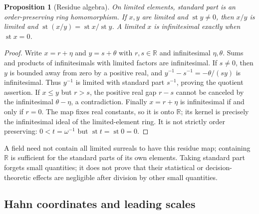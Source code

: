 \documentclass[11pt,a4paper]{article}
\numberwithin{equation}{section}
\newtheorem{proposition}[theorem]{Proposition}
\theoremstyle{definition}
\theoremstyle{remark}
\newcommand{\R}{\mathbb R}
\newcommand{\st}{\operatorname{st}}
\begin{document}
\begin{proposition}[Residue algebra]\label{fsp:prop:st}
On limited elements, standard part is an order-preserving ring homomorphism.
If $x,y$ are limited and $\st y\ne0$, then $x/y$ is limited and
$\st(x/y)=\st x/\st y$. A limited $x$ is infinitesimal exactly
when $\st x=0$.
\end{proposition}
\begin{proof}
Write $x=r+\eta$ and $y=s+\theta$ with $r,s\in\R$ and infinitesimal
$\eta,\theta$. Sums and products of infinitesimals with limited factors
are infinitesimal. If $s\ne0$, then $y$ is bounded away from zero by a
positive real, and $y^{-1}-s^{-1}=-\theta/(sy)$ is infinitesimal.
Thus $y^{-1}$ is limited with standard part $s^{-1}$, proving the
quotient assertion. If $x\le y$ but $r>s$, the positive real gap $r-s$
cannot be canceled by the infinitesimal $\theta-\eta$, a contradiction.
Finally $x=r+\eta$ is infinitesimal if and only if $r=0$.
The map fixes real constants, so it is onto $\R$; its kernel is precisely
the infinitesimal ideal of the limited-element ring. It is not strictly
order preserving: $0<t=\omega^{-1}$ but $\st t=\st0=0$.
\end{proof}

A field need not contain all limited surreals to have this residue map;
containing $\R$ is sufficient for the standard parts of its own elements.
Taking standard part forgets small quantities; it does not prove that their
statistical or decision-theoretic effects are negligible after division by
other small quantities.

\subsection{Hahn coordinates and leading scales}
\end{document}
